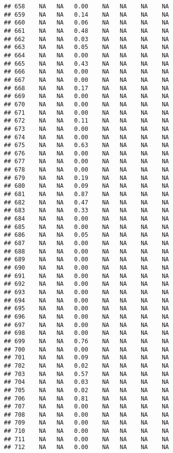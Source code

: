 \documentclass{article}\usepackage{graphicx, color}
\makeatletter
\newenvironment{kframe}{%
 \def\at@end@of@kframe{}%
 \ifinner\ifhmode%
  \def\at@end@of@kframe{\end{minipage}}%
  \begin{minipage}{\columnwidth}%
 \fi\fi%
 \def\FrameCommand##1{\hskip\@totalleftmargin \hskip-\fboxsep
 \colorbox{shadecolor}{##1}\hskip-\fboxsep
     \hskip-\linewidth \hskip-\@totalleftmargin \hskip\columnwidth}%
 \MakeFramed {\advance\hsize-\width
   \@totalleftmargin\z@ \linewidth\hsize
   \@setminipage}}%
 {\par\unskip\endMakeFramed%
 \at@end@of@kframe}
\newenvironment{knitrout}{}{} %
\makeatother
\begin{document}
\begin{knitrout}
\begin{kframe}
\begin{verbatim}
## 658    NA   NA   0.00    NA   NA    NA    NA
## 659    NA   NA   0.14    NA   NA    NA    NA
## 660    NA   NA   0.06    NA   NA    NA    NA
## 661    NA   NA   0.48    NA   NA    NA    NA
## 662    NA   NA   0.03    NA   NA    NA    NA
## 663    NA   NA   0.05    NA   NA    NA    NA
## 664    NA   NA   0.00    NA   NA    NA    NA
## 665    NA   NA   0.43    NA   NA    NA    NA
## 666    NA   NA   0.00    NA   NA    NA    NA
## 667    NA   NA   0.00    NA   NA    NA    NA
## 668    NA   NA   0.17    NA   NA    NA    NA
## 669    NA   NA   0.00    NA   NA    NA    NA
## 670    NA   NA   0.00    NA   NA    NA    NA
## 671    NA   NA   0.00    NA   NA    NA    NA
## 672    NA   NA   0.11    NA   NA    NA    NA
## 673    NA   NA   0.00    NA   NA    NA    NA
## 674    NA   NA   0.00    NA   NA    NA    NA
## 675    NA   NA   0.63    NA   NA    NA    NA
## 676    NA   NA   0.00    NA   NA    NA    NA
## 677    NA   NA   0.00    NA   NA    NA    NA
## 678    NA   NA   0.00    NA   NA    NA    NA
## 679    NA   NA   0.19    NA   NA    NA    NA
## 680    NA   NA   0.09    NA   NA    NA    NA
## 681    NA   NA   0.87    NA   NA    NA    NA
## 682    NA   NA   0.47    NA   NA    NA    NA
## 683    NA   NA   0.33    NA   NA    NA    NA
## 684    NA   NA   0.00    NA   NA    NA    NA
## 685    NA   NA   0.00    NA   NA    NA    NA
## 686    NA   NA   0.05    NA   NA    NA    NA
## 687    NA   NA   0.00    NA   NA    NA    NA
## 688    NA   NA   0.00    NA   NA    NA    NA
## 689    NA   NA   0.00    NA   NA    NA    NA
## 690    NA   NA   0.00    NA   NA    NA    NA
## 691    NA   NA   0.00    NA   NA    NA    NA
## 692    NA   NA   0.00    NA   NA    NA    NA
## 693    NA   NA   0.00    NA   NA    NA    NA
## 694    NA   NA   0.00    NA   NA    NA    NA
## 695    NA   NA   0.00    NA   NA    NA    NA
## 696    NA   NA   0.00    NA   NA    NA    NA
## 697    NA   NA   0.00    NA   NA    NA    NA
## 698    NA   NA   0.00    NA   NA    NA    NA
## 699    NA   NA   0.76    NA   NA    NA    NA
## 700    NA   NA   0.00    NA   NA    NA    NA
## 701    NA   NA   0.09    NA   NA    NA    NA
## 702    NA   NA   0.02    NA   NA    NA    NA
## 703    NA   NA   0.57    NA   NA    NA    NA
## 704    NA   NA   0.03    NA   NA    NA    NA
## 705    NA   NA   0.02    NA   NA    NA    NA
## 706    NA   NA   0.81    NA   NA    NA    NA
## 707    NA   NA   0.00    NA   NA    NA    NA
## 708    NA   NA   0.00    NA   NA    NA    NA
## 709    NA   NA   0.00    NA   NA    NA    NA
## 710    NA   NA   0.00    NA   NA    NA    NA
## 711    NA   NA   0.00    NA   NA    NA    NA
## 712    NA   NA   0.00    NA   NA    NA    NA

\end{verbatim}
\end{kframe}
\end{knitrout}
\end{document}
